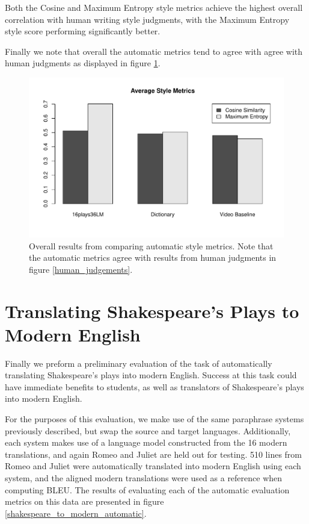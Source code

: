 \documentclass[10pt,a5paper,twoside]{article}
\begin{document}
Both the Cosine and Maximum Entropy style metrics achieve the highest overall correlation with human writing style judgments, with the Maximum Entropy style score performing significantly better.

Finally we note that overall the automatic metrics tend to agree with agree with human judgments as displayed in figure \ref{style_metrics}.

\begin{figure}
  \begin{center}
    \includegraphics[width=5in]{figures/style_metrics.pdf}
    \end{center}
    \caption{Overall results from comparing automatic style metrics.  Note that the automatic metrics agree with results from human judgments in figure \ref{human_judgements}.}
    \label{style_metrics}
\end{figure}

\section{Translating Shakespeare's Plays to Modern English}
Finally we preform a preliminary evaluation of the task of automatically translating Shakespeare's plays into modern English.  Success at this task could have immediate
benefits to students, as well as translators of Shakespeare's plays into modern English. 

For the purposes of this evaluation, 
we make use of the same paraphrase systems previously described, but swap the source and target languages.
Additionally, each system makes use of a language model constructed from the 16 modern translations, and again Romeo and Juliet are held out for testing.  
510 lines from Romeo and Juliet were automatically translated into modern English using each system, and the aligned modern 
translations were used as a reference when computing BLEU.  The results of evaluating each of the automatic evaluation metrics on this
data are presented in figure \ref{shakespeare_to_modern_automatic}.  
\end{document}
